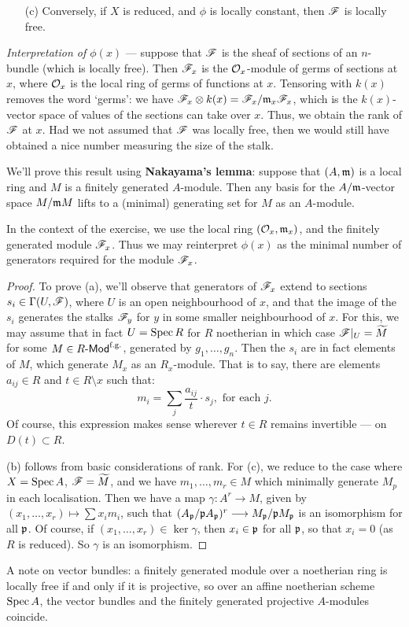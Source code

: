 \documentclass[11pt]{article}
\newcommand{\Index}[1]{\index{#1}#1}
\begin{document}
\begin{II.5 Sheaves of Modules}
\begin{itemise}
\begin{enumerate}
\item[(c)] Conversely, if $X$ is reduced, and $\phi$ is locally constant, then
$\mathscr{F}$ is locally free.
\end{enumerate}
\emph{Interpretation of $\phi(x)$} --- suppose that $\mathscr{F}$ is the sheaf of
sections of an $n$-bundle (which is locally free). Then $\mathscr{F}_x$ is the
$\mathcal{O}_x$-module of germs of sections at $x$, where $\mathcal{O}_x$ is the local ring
of germs of functions at $x$. Tensoring with $k(x)$ removes the word `germs': we
have $\mathscr{F}_x\otimes k(x)=\mathscr{F}_x/\mathfrak{m}_x\mathscr{F}_x$, which is the $k(x)$-vector
space of values of the sections can take over $x$. Thus, we obtain the rank of
$\mathscr{F}$ at $x$. Had we not assumed that $\mathscr{F}$ was locally free, then we would
still have obtained a nice number measuring the size of the stalk.

\INDENT We'll prove this result using \textbf{\Index{Nakayama's lemma}}: suppose
that $(A,\mathfrak{m})$ is a local ring and $M$ is a finitely generated $A$-module.
Then any basis for the $A/\mathfrak{m}$-vector space $M/\mathfrak{m} M$ lifts to a (minimal)
generating set for $M$ as an $A$-module.

\INDENT In the context of the exercise, we use the local ring
$(\mathcal{O}_x,\mathfrak{m}_x)$, and the finitely generated module $\mathscr{F}_x$. Thus we may
reinterpret $\phi(x)$ as the minimal number of generators required for the
module $\mathscr{F}_x$.

\begin{proof} To prove (a), we'll observe that generators of $\mathscr{F}_x$ extend to
sections $s_i\in\Gamma(U,\mathscr{F})$, where $U$ is an open neighbourhood of $x$, and
that the image of the $s_i$ generates the stalks $\mathscr{F}_y$ for $y$ in some
smaller neighbourhood of $x$. For this, we may assume that in fact $U=\operatorname{Spec} R$
for $R$ noetherian in which case $\mathscr{F}|_U=\widetilde M$ for some $M\in
R\operatorname{{\mathsf{\!-Mod}}}^\text{f.g.}$, generated by $g_1,\ldots,g_n$. Then the $s_i$ are in
fact elements of $M$, which generate $M_x$ as an $R_x$-module. That is to say,
there are elements $a_{ij}\in R$ and $t\in R\setminus x$ such that:
\[m_i=\sum_{j}\frac{a_{ij}}{t}\cdot s_j, \text{ for each $j$}.\]
Of course, this expression makes sense wherever $t\in R$ remains invertible ---
on $D(t)\subset R$.

(b) follows from basic considerations of rank. For (c), we reduce to the case
where $X=\operatorname{Spec} A$, $\mathscr{F}=\widetilde M$, and we have $m_1,\ldots,m_r\in M$ which
minimally generate $M_p$ in each localisation. Then we have a map $\gamma:A^r\to
M$, given by $(x_1,\ldots,x_r)\mapsto \sum x_im_i$, such that $(A_{\mathfrak{p}}/\mathfrak{p}
A_{\mathfrak{p}})^r\longrightarrow M_{\mathfrak{p}}/\mathfrak{p} M_{\mathfrak{p}}$ is an isomorphism for all $\mathfrak{p}$. Of
course, if $(x_1,\ldots,x_r)\in\ker\gamma$, then $x_i\in\mathfrak{p}$ for all
$\mathfrak{p}$, so that $x_i=0$ (as $R$ is reduced). So $\gamma$ is an isomorphism.
\end{proof}
\item A note on vector bundles: a finitely generated module over a noetherian
ring is locally free if and only if it is projective, so over an affine
noetherian scheme $\operatorname{Spec} A$, the vector bundles and the finitely generated
projective $A$-modules coincide.
\end{itemise}

\end{II.5 Sheaves of Modules}
\end{document}

